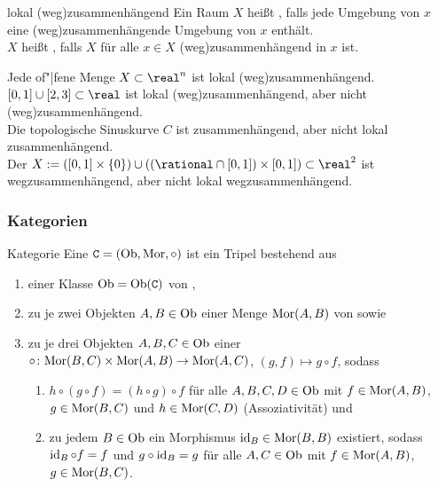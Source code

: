 \begin{Def}{lokal (weg)zusammenhängend}
    Ein Raum $X$ heißt , falls
    jede Umgebung von $x$ eine (weg)zusammenhängende Umgebung von $x$
    enthält. \\
    $X$ heißt , falls $X$ für alle
    $x \in X$ (weg)zusammenhängend in $x$ ist.
\end{Def}

\begin{Bsp}
    Jede of"|fene Menge $X \subset \real^n$ ist lokal (weg)zusammenhängend. \\
    $[0, 1] \cup [2, 3] \subset \real$ ist lokal (weg)zusammenhängend,
    aber nicht (weg)zusammenhängend. \\
    Die topologische Sinuskurve $C$ ist zusammenhängend,
    aber nicht lokal zusammenhängend. \\
    Der  $X := ([0, 1] \times \{0\}) \cup
    ((\rational \cap [0, 1]) \times [0, 1]) \subset \real^2$
    ist wegzusammenhängend, aber nicht lokal wegzusammenhängend.
\end{Bsp}

\pagebreak

\subsubsection{%
    Kategorien%
}

\begin{Def}{Kategorie}
    Eine  $\mathtt{C} = (\text{Ob}, \text{Mor}, \circ)$ ist ein Tripel
    bestehend aus
    \begin{enumerate}
        \item
        einer Klasse $\text{Ob} = \text{Ob}(\mathtt{C})$ von ,

        \item
        zu je zwei Objekten $A, B \in \text{Ob}$ einer Menge $\text{Mor}(A, B)$ von
         sowie

        \item
        zu je drei Objekten $A, B, C \in \text{Ob}$ einer  \\
        $\circ\colon \text{Mor}(B, C) \times \text{Mor}(A, B) \rightarrow \text{Mor}(A, C)$,
        $(g, f) \mapsto g \circ f$, sodass
        \begin{enumerate}
            \item
            $h \circ (g \circ f) = (h \circ g) \circ f$
            für alle $A, B, C, D \in \text{Ob}$ mit $f \in \text{Mor}(A, B)$,
            $g \in \text{Mor}(B, C)$ und $h \in \text{Mor}(C, D)$ (Assoziativität) und

            \item
            zu jedem $B \in \text{Ob}$ ein Morphismus $\operatorname{id}_B \in \text{Mor}(B, B)$
            existiert, sodass $\operatorname{id}_B \circ f = f$ und $g \circ \operatorname{id}_B = g$
            für alle $A, C \in \text{Ob}$ mit
            $f \in \text{Mor}(A, B)$, $g \in \text{Mor}(B, C)$.
        \end{enumerate}
    \end{enumerate}
\end{Def}

